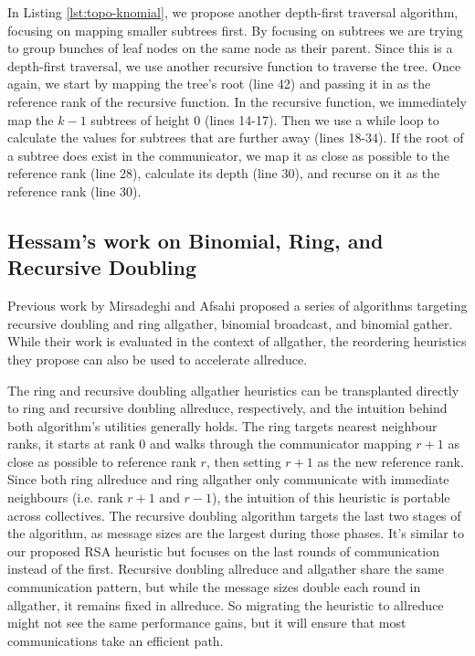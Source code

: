 In Listing \ref{lst:topo-knomial}, we propose another depth-first traversal algorithm, focusing on mapping smaller subtrees first.
By focusing on subtrees we are trying to group bunches of leaf nodes on the same node as their parent.
Since this is a depth-first traversal, we use another recursive function to traverse the tree. 
Once again, we start by mapping the tree's root (line 42) and passing it in as the reference rank of the recursive function.
In the recursive function, we immediately map the $k-1$ subtrees of height 0 (lines 14-17).
Then we use a while loop to calculate the values for subtrees that are further away (lines 18-34).
If the root of a subtree does exist in the communicator, we map it as close as possible to the reference rank (line 28), calculate its depth (line 30), and recurse on it as the reference rank (line 30).

\subsection{Hessam's work on Binomial, Ring, and Recursive Doubling}

Previous work by Mirsadeghi and Afsahi \cite{Mirsadeghi2016TopoAwareCollRR} proposed a series of algorithms targeting recursive doubling and ring allgather, binomial broadcast, and binomial gather. 
While their work is evaluated in the context of allgather, the reordering heuristics they propose can also be used to accelerate allreduce. 

The ring and recursive doubling allgather heuristics can be transplanted directly to ring and recursive doubling allreduce, respectively, and the intuition behind both algorithm's utilities generally holds. 
The ring targets nearest neighbour ranks, it starts at rank 0 and walks through the communicator mapping $r+1$ as close as possible to reference rank $r$, then setting $r+1$ as the new reference rank.
Since both ring allreduce and ring allgather only communicate with immediate neighbours (i.e. rank $r+1$ and $r-1$), the intuition of this heuristic is portable across collectives.
The recursive doubling algorithm targets the last two stages of the algorithm, as message sizes are the largest during those phases. 
It's similar to our proposed RSA heuristic but focuses on the last rounds of communication instead of the first. 
Recursive doubling allreduce and allgather share the same communication pattern, but while the message sizes double each round in allgather,  it remains fixed in allreduce.
So migrating the heuristic to allreduce might not see the same performance gains, but it will ensure that most communications take an efficient path.

